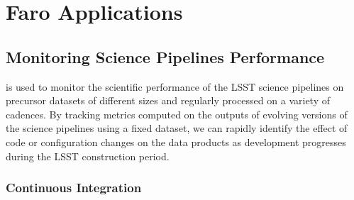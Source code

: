 \section{Faro Applications} \label{sec:applications}

\subsection{Monitoring Science Pipelines Performance} \label{ssec:monitoring}

\faro is used to monitor the scientific performance of the LSST science pipelines on precursor datasets of different sizes and regularly processed on a variety of cadences\cite{dmtn-091}.
By tracking metrics computed on the outputs of evolving versions of the science pipelines using a fixed dataset, we can rapidly identify the effect of code or configuration changes on the data products as development progresses during the LSST construction period.

\subsubsection{Continuous Integration}\label{sssec:ci}

